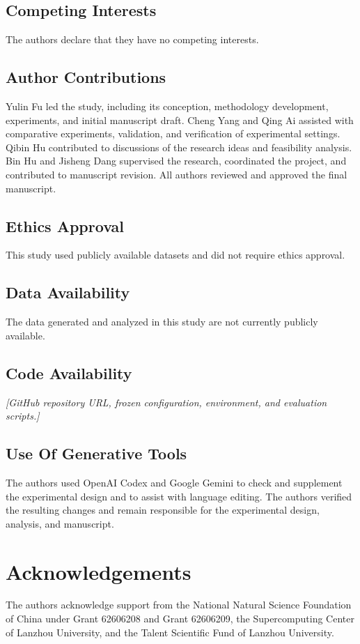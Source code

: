 \documentclass[pdflatex,iicol,sn-apa]{sn-jnl}
\newcommand{\pending}[1]{{\color{DraftText}\textit{[#1]}}}
\begin{document}
\subsection*{Competing Interests}
The authors declare that they have no competing interests.
\subsection*{Author Contributions}
Yulin Fu led the study, including its conception, methodology development, experiments, and initial manuscript draft. Cheng Yang and Qing Ai assisted with comparative experiments, validation, and verification of experimental settings. Qibin Hu contributed to discussions of the research ideas and feasibility analysis. Bin Hu and Jisheng Dang supervised the research, coordinated the project, and contributed to manuscript revision. All authors reviewed and approved the final manuscript.
\subsection*{Ethics Approval}
This study used publicly available datasets and did not require ethics approval.
\subsection*{Data Availability}
The data generated and analyzed in this study are not currently publicly available.
\subsection*{Code Availability}
\pending{GitHub repository URL, frozen configuration, environment, and evaluation scripts.}
\subsection*{Use Of Generative Tools}
The authors used OpenAI Codex and Google Gemini to check and supplement the experimental design and to assist with language editing. The authors verified the resulting changes and remain responsible for the experimental design, analysis, and manuscript.

\section*{Acknowledgements}
The authors acknowledge support from the National Natural Science Foundation of China under Grant 62606208 and Grant 62606209, the Supercomputing Center of Lanzhou University, and the Talent Scientific Fund of Lanzhou University.


\end{document}
